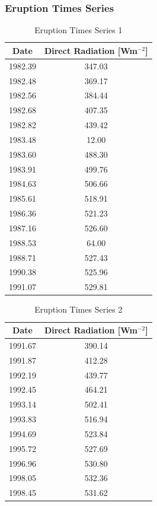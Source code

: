 \documentclass[12pt]{article}
\begin{document}
\subsubsection{Eruption Times Series}
\begin{table}[H]
    \captionsetup{singlelinecheck = false, justification=justified}
    \caption{Eruption Times Series 1}
    \label{tab:erupt1}
    \begin{tabular}{c c}
    \hline
    Date & Direct Radiation [Wm$^{-2}$] \\
    \hline
    1982.39 & 347.03 \\
    1982.48 & 369.17 \\
    1982.56 & 384.44 \\
    1982.68 & 407.35 \\
    1982.82 & 439.42 \\
    1983.48 & 12.00 \\
    1983.60 & 488.30 \\
    1983.91 & 499.76 \\
    1984.63 & 506.66 \\
    1985.61 & 518.91 \\
    1986.36 & 521.23 \\
    1987.16 & 526.60 \\
    1988.53 & 64.00 \\
    1988.71 & 527.43 \\
    1990.38 & 525.96 \\
    1991.07 & 529.81 \\
    \hline
    \end{tabular}
\end{table}
\begin{table}[H]
    \captionsetup{singlelinecheck = false, justification=justified}
    \caption{Eruption Times Series 2}
    \label{tab:erupt2}
    \begin{tabular}{c c}
    \hline
    Date & Direct Radiation [Wm$^{-2}$] \\
    \hline
    1991.67 & 390.14 \\
    1991.87 & 412.28 \\
    1992.19 & 439.77 \\
    1992.45 & 464.21 \\
    1993.14 & 502.41 \\
    1993.83 & 516.94 \\
    1994.69 & 523.84 \\
    1995.72 & 527.69 \\
    1996.96 & 530.80 \\
    1998.05 & 532.36 \\
    1998.45 & 531.62 \\
    \hline
    \end{tabular}
\end{table}
\end{document}
